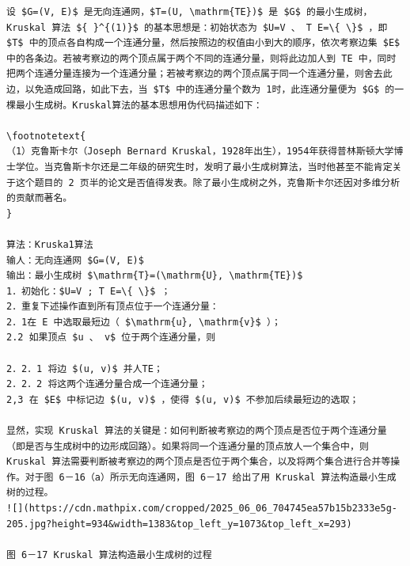 \documentclass[10pt]{article}
\let\svthefootnote\thefootnote
\newcommand\blfootnotetext[1]{%
  \let\thefootnote\relax\footnote{#1}%
  \addtocounter{footnote}{-1}%
  \let\thefootnote\svthefootnote%
}
\let\svfootnotetext\footnotetext
\renewcommand\footnotetext[2][?]{%
  \if\relax#1\relax%
    \ifnum\value{footnote}=0\blfootnotetext{#2}\else\svfootnotetext{#2}\fi%
  \else%
    \if?#1\ifnum\value{footnote}=0\blfootnotetext{#2}\else\svfootnotetext{#2}\fi%
    \else\svfootnotetext[#1]{#2}\fi%
  \fi
}
\begin{document}
\begin{verbatim}
设 $G=(V, E)$ 是无向连通网，$T=(U, \mathrm{TE})$ 是 $G$ 的最小生成树， Kruskal 算法 ${ }^{(1)}$ 的基本思想是：初始状态为 $U=V 、 T E=\{ \}$ ，即 $T$ 中的顶点各自构成一个连通分量，然后按照边的权值由小到大的顺序，依次考察边集 $E$ 中的各条边。若被考察边的两个顶点属于两个不同的连通分量，则将此边加人到 TE 中，同时把两个连通分量连接为一个连通分量；若被考察边的两个顶点属于同一个连通分量，则舍去此边，以免造成回路，如此下去，当 $T$ 中的连通分量个数为 1时，此连通分量便为 $G$ 的一棵最小生成树。Kruskal算法的基本思想用伪代码描述如下：

\footnotetext{
（1）克鲁斯卡尔（Joseph Bernard Kruskal，1928年出生），1954年获得普林斯顿大学博士学位。当克鲁斯卡尔还是二年级的研究生时，发明了最小生成树算法，当时他甚至不能肯定关于这个题目的 2 页半的论文是否值得发表。除了最小生成树之外，克鲁斯卡尔还因对多维分析的贡献而著名。
}

算法：Kruska1算法
输人：无向连通网 $G=(V, E)$
输出：最小生成树 $\mathrm{T}=(\mathrm{U}, \mathrm{TE})$
1．初始化：$U=V ; T E=\{ \}$ ；
2．重复下述操作直到所有顶点位于一个连通分量：
2．1在 E 中选取最短边（ $\mathrm{u}, \mathrm{v}$ ）；
2.2 如果顶点 $u 、 v$ 位于两个连通分量，则

2．2．1 将边 $(u, v)$ 并人TE；
2．2．2 将这两个连通分量合成一个连通分量；
2,3 在 $E$ 中标记边 $(u, v)$ ，使得 $(u, v)$ 不参加后续最短边的选取；

显然，实现 Kruskal 算法的关键是：如何判断被考察边的两个顶点是否位于两个连通分量（即是否与生成树中的边形成回路）。如果将同一个连通分量的顶点放人一个集合中，则 Kruskal 算法需要判断被考察边的两个顶点是否位于两个集合，以及将两个集合进行合并等操作。对于图 6－16（a）所示无向连通网，图 6－17 给出了用 Kruskal 算法构造最小生成树的过程。
![](https://cdn.mathpix.com/cropped/2025_06_06_704745ea57b15b2333e5g-205.jpg?height=934&width=1383&top_left_y=1073&top_left_x=293)

图 6－17 Kruskal 算法构造最小生成树的过程


\end{verbatim}
\end{document}
